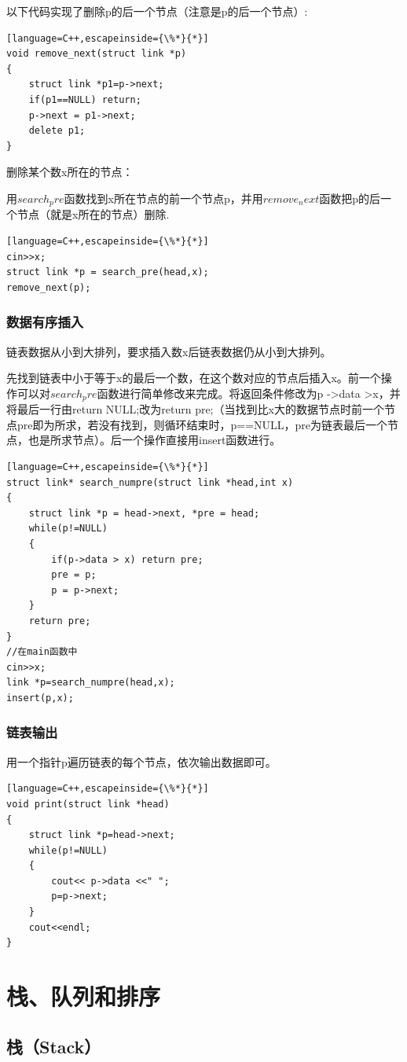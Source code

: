 \documentclass[UTF8]{ctexart}
\begin{document}
以下代码实现了删除p的后一个节点（注意是p的后一个节点）:
\begin{lstlisting}[language=C++,escapeinside={\%*}{*}]
void remove_next(struct link *p)
{
	struct link *p1=p->next;
	if(p1==NULL) return; 
	p->next = p1->next;
	delete p1;
}
\end{lstlisting}
删除某个数x所在的节点：

用$search_pre$函数找到x所在节点的前一个节点p，并用$remove_next$函数把p的后一个节点（就是x所在的节点）删除.
\begin{lstlisting}[language=C++,escapeinside={\%*}{*}]
cin>>x;
struct link *p = search_pre(head,x);
remove_next(p);
\end{lstlisting}
\subsubsection{数据有序插入}
链表数据从小到大排列，要求插入数x后链表数据仍从小到大排列。

先找到链表中小于等于x的最后一个数，在这个数对应的节点后插入x。前一个操作可以对$search_pre$函数进行简单修改来完成。将返回条件修改为p -\textgreater data \textgreater x，并将最后一行由return NULL;改为return pre;（当找到比x大的数据节点时前一个节点pre即为所求，若没有找到，则循环结束时，p==NULL，pre为链表最后一个节点，也是所求节点）。后一个操作直接用insert函数进行。
\begin{lstlisting}[language=C++,escapeinside={\%*}{*}]
struct link* search_numpre(struct link *head,int x)
{
	struct link *p = head->next, *pre = head;
	while(p!=NULL)
	{
		if(p->data > x) return pre;
		pre = p;
		p = p->next;
	}
	return pre;
}
//在main函数中
cin>>x;
link *p=search_numpre(head,x);
insert(p,x);
\end{lstlisting}
\subsubsection{链表输出}
用一个指针p遍历链表的每个节点，依次输出数据即可。
\begin{lstlisting}[language=C++,escapeinside={\%*}{*}]
void print(struct link *head)
{
	struct link *p=head->next;
	while(p!=NULL)
	{
		cout<< p->data <<" ";
		p=p->next;
	}
	cout<<endl;
}

\end{lstlisting}


\section{栈、队列和排序}
\subsection{栈（Stack）}
\end{document}
